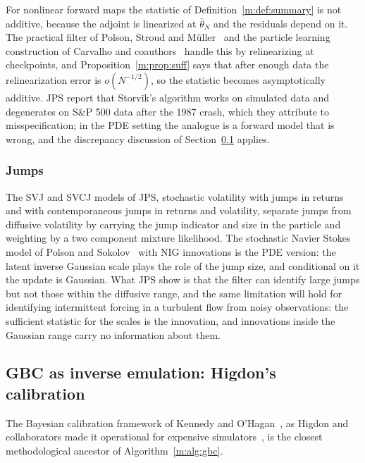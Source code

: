 For nonlinear forward maps the statistic of Definition~\ref{m:def:summary} is not additive, because the adjoint is linearized at $\bar\theta_N$ and the residuals depend on it. The practical filter of Polson, Stroud and M\"uller~\cite{psm2008} and the particle learning construction of Carvalho and coauthors~\cite{cjlp2010} handle this by relinearizing at checkpoints, and Proposition~\ref{m:prop:suff} says that after enough data the relinearization error is $o(N^{-1/2})$, so the statistic becomes asymptotically additive. JPS report that Storvik's algorithm works on simulated data and degenerates on S\&P 500 data after the 1987 crash, which they attribute to misspecification; in the PDE setting the analogue is a forward model that is wrong, and the discrepancy discussion of Section~\ref{m:sec:higdon} applies.

\subsubsection{Jumps} The SVJ and SVCJ models of JPS, stochastic volatility with jumps in returns and with contemporaneous jumps in returns and volatility, separate jumps from diffusive volatility by carrying the jump indicator and size in the particle and weighting by a two component mixture likelihood. The stochastic Navier Stokes model of Polson and Sokolov~\cite{polsonsokolov2026ns} with NIG innovations is the PDE version: the latent inverse Gaussian scale plays the role of the jump size, and conditional on it the update is Gaussian. What JPS show is that the filter can identify large jumps but not those within the diffusive range, and the same limitation will hold for identifying intermittent forcing in a turbulent flow from noisy observations: the sufficient statistic for the scales is the innovation, and innovations inside the Gaussian range carry no information about them.

\subsection{GBC as inverse emulation: Higdon's calibration}\label{m:sec:higdon}

The Bayesian calibration framework of Kennedy and O'Hagan~\cite{kennedyohagan2001}, as Higdon and collaborators made it operational for expensive simulators~\cite{higdon2004,higdon2008,williams2006}, is the closest methodological ancestor of Algorithm~\ref{m:alg:gbc}.

